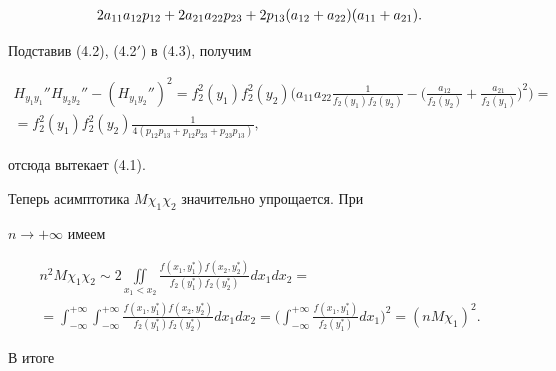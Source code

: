 \begin{pf}
\begin{align}
2a_{11}a_{12}p_{12}+2a_{21}a_{22}p_{23}+2p_{13}(a_{12}+


a_{22})(a_{11}+a_{21}).\notag


\end{align}





Подставив (4.2), (4.2$'$) в (4.3), получим


\begin{multline*}


H_{y_1y_1}''H_{y_2y_2}''-(H_{y_1y_2}'')^2=


f_2^2{(y_1)}f_2^2{(y_2)}\bigg(a_{11}a_{22}\frac{1}{f_2(y_1)f_2(y_2)}-


\bigg(\frac{a_{12}}{f_2(y_2)}+\frac{a_{21}}{f_2(y_1)}\bigg)^2\bigg)=\\


%


=f_2^2{(y_1)}f_2^2{(y_2)}


\frac{1}{4(p_{12}p_{13}+p_{12}p_{23} +p_{23}p_{13})},


\end{multline*}


отсюда вытекает (4.1).


\end{pf}





Теперь асимптотика $M\chi_1 \chi_2$ значительно упрощается. При


$n\to+\infty$ имеем


\begin{multline*}


n^2M\chi_1 \chi_2 \sim 2\iint\limits_{x_1<x_2}


\frac{f(x_1,y_1^*)f(x_2,y_2^*)}


{f_2(y_1^*)f_2(y_2^*)}dx_1dx_2=\\


%


=\int_{-\infty}^{+\infty} \int_{-\infty}^{+\infty}


\frac{f(x_1,y_1^*)f(x_2,y_2^*)}{f_2(y_1^*)f_2(y_2^*)}dx_1dx_2=


\bigg(\int_{-\infty}^{+\infty}


\frac{f(x_1,y_1^*)}{f_2(y_1^*)}


dx_1 \bigg)^2 = (nM\chi_1)^2.


\end{multline*}


В итоге


$$


